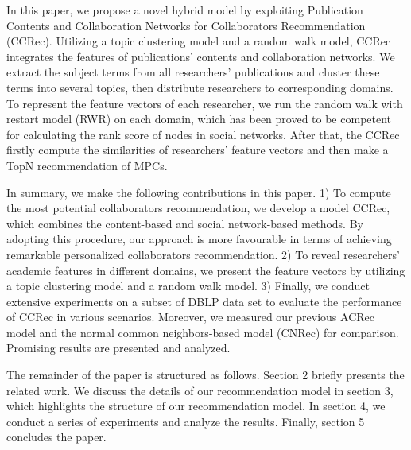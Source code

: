 In this paper, we propose a novel hybrid model by exploiting Publication Contents and Collaboration Networks for Collaborators Recommendation (CCRec). Utilizing a topic clustering model \cite{pan2010research} \cite{pham2011clustering} and a random walk model, CCRec integrates the features of publications' contents and collaboration networks. We extract the subject terms from all researchers' publications and cluster these terms into several topics, then distribute researchers to corresponding domains. To represent the feature vectors of each researcher, we run the random walk with restart model (RWR) on each domain, which has been proved to be competent for calculating the rank score of nodes in social networks. After that, the CCRec firstly compute the similarities of researchers' feature vectors and then make a TopN recommendation of MPCs.

In summary, we make the following contributions in this paper. 1) To compute the most potential collaborators recommendation, we develop a model CCRec, which combines the content-based and social network-based methods. By adopting this procedure, our approach is more favourable in terms of achieving remarkable personalized collaborators recommendation. 2) To reveal researchers' academic features in different domains, we present the feature vectors by utilizing a topic clustering model and a random walk model. 3) Finally, we conduct extensive experiments on a subset of DBLP data set to evaluate the performance of CCRec in various scenarios. Moreover, we measured our previous ACRec model and the normal common neighbors-based model (CNRec) for comparison. Promising results are presented and analyzed.

The remainder of the paper is structured as follows. Section 2 briefly presents the related work. We discuss the details of our recommendation model in section 3, which highlights the structure of our recommendation model. In section 4, we conduct a series of experiments and analyze the results. Finally, section 5 concludes the paper.



